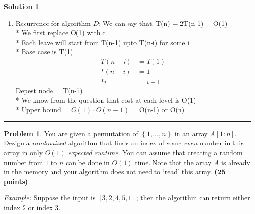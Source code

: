 \documentclass{article}
\theoremstyle{definition}
\newtheorem{problem}{Problem}
\def\fline{\rule{0.75\linewidth}{0.5pt}}
\newcommand{\finishline}{\vspace{-15pt}\begin{center}\fline\end{center}}
\newtheorem*{solution*}{Solution}
\newenvironment{solution}{\begin{solution*}}{{\finishline} \end{solution*}}
\newcommand{\grade}[1]{\hfill{\textbf{($\mathbf{#1}$ points)}}}
\newcommand{\set}[1]{\ensuremath{\left\{ #1 \right\}}}
\begin{document}
\begin{solution}
\begin{enumerate}[label=(\Alph*)]
		\item Recurrence for algorithm $D$:  
		We can say that, T(n) = 2T(n-1) + O(1) \\*
		We first replace O(1) with c  \\*
		Each leave will start from T(n-1) upto T(n-i) for some i \\*
		Base case is T(1)
		\begin{align*}
			T(n-i) &= T(1) \\*
			(n-i) &= 1 \\*
			i &= i - 1
		\end{align*}
		Depest node = T(n-1) \\*
		We know from the question that cost at each level is O(1) \\*
		Upper bound = $O(1)\cdot O(n-1)$ = O(n-1) or O(n)

	\end{enumerate}
\end{solution}
\smallskip

\begin{problem}
	You are given a permutation of $\set{1,\ldots,n}$ in an array $A[1:n]$. Design a \emph{randomized} algorithm that finds an index of some \emph{even} number 
	in this array in only $O(1)$ \emph{expected runtime}. You can assume that 
	creating a random number from $1$ to $n$ can be done in $O(1)$ time. Note that the array $A$ is already in the memory and your algorithm does not need to `read' this array.  \grade{25}
	
	\emph{Example:} Suppose the input is $[3,2,4,5,1]$; then the algorithm can return either index $2$ or index $3$. 	
\end{problem}

\smallskip
\end{document}
